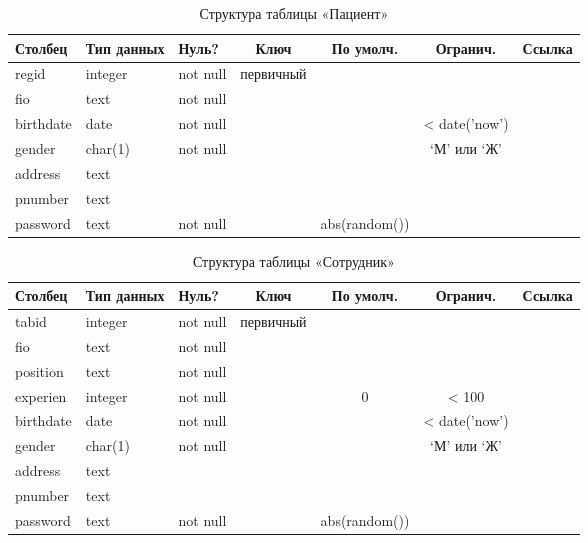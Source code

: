 \documentclass[14pt,a4paper,russian]{extreport}
\begin{document}
\begin{table}[h!]
    \caption{ } 
    \begin{subtable}[t]{\textwidth}
        \caption{Структура таблицы «Пациент»}
    \begin{tabularx}{\textwidth}{| X | X | X | c | c | c | X |}
        \hline
        \textbf{Столбец} & \textbf{Тип данных} & \textbf{Нуль?} & \textbf{Ключ} & \textbf{По
        умолч.} & \textbf{Огранич.} & \textbf{Ссылка} \\ \hline
        regid & integer & not null & первичный & & & \\ \hline
        fio & text & not null & & & & \\ \hline
        birthdate & date & not null & & & < date('now') & \\ \hline
        gender & char(1) & not null & & & `М' или `Ж' & \\ \hline
        address & text & & & & & \\ \hline
        pnumber & text & & & & & \\ \hline
        password & text & not null & & abs(random()) & & \\ \hline
    \end{tabularx}
    \end{subtable}
    \label{table:pat}
\end{table}

\begin{table}[h!]
    \caption{ } 
    \begin{subtable}[t]{\textwidth}
    \caption{Структура таблицы «Сотрудник»}
    \begin{tabularx}{\textwidth}{| X | X | X | c | c | c | X |}
        \hline
        \textbf{Столбец} & \textbf{Тип данных} & \textbf{Нуль?} & \textbf{Ключ} & \textbf{По
        умолч.} & \textbf{Огранич.} & \textbf{Ссылка} \\ \hline
        tabid & integer & not null & первичный & & &  \\ \hline
        fio & text & not null & & & & \\ \hline
        position & text & not null & & & & \\ \hline
        experien & integer & not null & & 0 & < 100 & \\ \hline
        birthdate & date & not null & & & < date('now') & \\ \hline
        gender & char(1) & not null & & & `М' или `Ж' & \\ \hline
        address & text & & & & & \\ \hline
        pnumber & text & & & & & \\ \hline
        password & text & not null & & abs(random()) & & \\ \hline
    \end{tabularx}
    \end{subtable}
    \label{table:emp}
\end{table}
\end{document}
